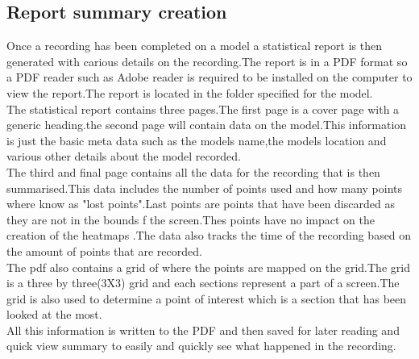 \subsection{Report summary creation}
Once a recording has been completed on a model a statistical report is then generated with carious details on the recording.The report is in a PDF format so a PDF reader such as Adobe reader is required to be installed on the computer to view the report.The report is located in the folder specified for the model.\\
The statistical report contains three pages.The first page is a cover page with a generic heading.the second page will contain data on the model.This information is just the basic meta data such as the models name,the models location and various other details about the model recorded.\\
The third and final page contains all the data for the recording that is then summarised.This data includes the number of points used and how many points where know as "lost points".Last points are points that have been discarded as they are not in the bounds f the screen.Thes points have no impact on the creation of the heatmaps .The data also tracks the time of the recording based on the amount of points that are recorded.\\
The pdf also contains a grid of where the points are mapped on the grid.The grid is a three by three(3X3) grid and each sections represent a part of a screen.The grid is also used to determine a point of interest which is a section that has been looked at the most.\\
All this information is written to the PDF and then saved for later reading and quick view summary to easily and quickly see what happened in the recording. \\